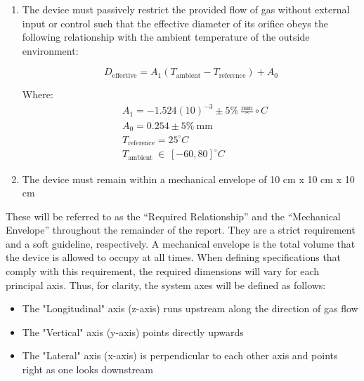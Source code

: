 \documentclass[12pt, letterpaper]{report}%
\newcommand{\degC}{^{\circ}C}    %
\newcommand{\requiredRelationship}{D_{\text{effective}} = A_1 (T_{\text{ambient}} - T_{\text{reference}}) + A_0}
\newcommand{\specTempHigh}{80} %
\newcommand{\specTempLow}{-60} %
\newcommand{\specTempRef}{25} %
\newcommand{\specTolerancePercent}{\pm 5\%}
\newcommand{\specDeffConstOne}{-1.524(10)^{-3}} %
\newcommand{\specDeffConstTwo}{0.254} %
\begin{document}
        \begin{enumerate}
            \item The device must passively restrict the provided flow of gas without external input or control such that the effective diameter of its orifice obeys the following relationship with the ambient temperature of the outside environment:
            
                \begin{equation}
                    \requiredRelationship
                    \label{eq: required_relationship}
                \end{equation}

                Where:
                \begin{align*}
                    &A_1 = \specDeffConstOne \specTolerancePercent\ \frac{\text{mm}}\degC
                    \\
                    &A_0 = \specDeffConstTwo \specTolerancePercent\ \text{mm}
                    \\
                    &T_{\text{reference}} = \specTempRef \degC
                    \\
                    &T_{\text{ambient}}\ \in\ [\specTempLow, \specTempHigh] \degC 
                \end{align*}

            \item The device must remain within a mechanical envelope of 10 cm x 10 cm x 10 cm
        \end{enumerate}
        
        These will be referred to as the “Required Relationship” and the “Mechanical Envelope” throughout the remainder of the report. They are a strict requirement and a soft guideline, respectively.
        A mechanical envelope is the total volume that the device is allowed to occupy at all times.
        When defining specifications that comply with this requirement, the required dimensions will vary for each principal axis.
        Thus, for clarity, the system axes will be defined as follows:

        \newpage

        \begin{itemize}
            \item The "Longitudinal" axis (z-axis) runs upstream along the direction of gas flow
            \item The "Vertical" axis (y-axis) points directly upwards
            \item The "Lateral" axis (x-axis) is perpendicular to each other axis and points right as one looks downstream
        \end{itemize}
\end{document}
